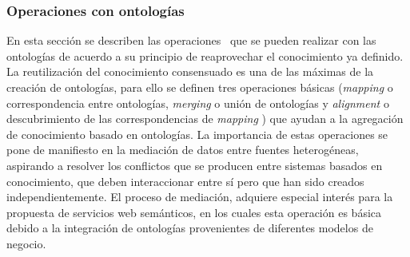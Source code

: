 \subsubsection{Operaciones con ontologías}\label{op-ontologias}
En esta sección se describen las
operaciones~\cite{bruijn06-seman-web} que se pueden
realizar con las ontologías de acuerdo a su principio de reaprovechar el
conocimiento ya definido. La reutilización del conocimiento consensuado  es una de las
máximas de la creación de ontologías, para ello se definen tres operaciones
básicas (\textit{mapping} o correspondencia entre ontologías, \textit{merging} o
unión de ontologías y \textit{alignment} o descubrimiento de las
correspondencias de \textit{mapping} ) que
ayudan a la agregación de conocimiento basado en ontologías. La
importancia de estas operaciones se pone de manifiesto en la mediación de datos
entre fuentes heterogéneas, aspirando a resolver los conflictos que se producen
entre sistemas basados en conocimiento, que deben interaccionar entre sí pero que
han sido creados independientemente. El proceso de mediación, adquiere especial
interés para la propuesta de servicios web semánticos, en los cuales esta
operación es básica debido a la integración de ontologías provenientes de
diferentes modelos de negocio.  


